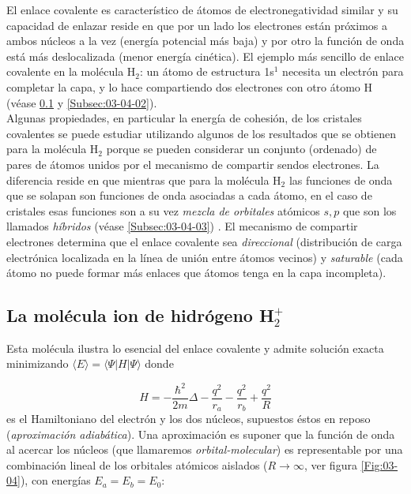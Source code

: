 El enlace covalente es característico de átomos de electronegatividad similar y su capacidad de enlazar reside en que por un lado los electrones están próximos a ambos núcleos a la vez (energía potencial más baja) y por otro la función de onda está más deslocalizada (menor energía cinética). El ejemplo más sencillo de enlace covalente en la molécula H$_2$: un átomo de estructura 1s$^1$ necesita un electrón para completar la capa, y lo hace compartiendo dos electrones con otro átomo H (véase \ref{Subsec:03-04-01} y \ref{Subsec:03-04-02}). \\

Algunas propiedades, en particular la energía de cohesión, de los cristales covalentes se puede estudiar utilizando algunos de los resultados que se obtienen para la molécula H$_2$ porque se pueden considerar un conjunto (ordenado) de pares de átomos unidos por el mecanismo de compartir sendos electrones. La diferencia reside en que mientras que para la molécula H$_2$ las funciones de onda que se solapan son funciones de onda asociadas a cada átomo, en el caso de cristales esas funciones son a su vez \textit{mezcla de orbitales} atómicos $s,p$ que son los llamados \textit{híbridos} (véase \ref{Subsec:03-04-03}) . El mecanismo de compartir electrones determina que el enlace covalente sea \textit{direccional} (distribución de carga electrónica localizada en la línea de unión entre átomos vecinos) y \textit{saturable} (cada átomo no puede formar más enlaces que átomos tenga en la capa incompleta).

\subsection{La molécula ion de hidrógeno H$_2^+$} \label{Subsec:03-04-01}

Esta molécula ilustra lo esencial del enlace covalente y admite solución exacta minimizando $\langle E \rangle = \langle \Psi | H | \Psi \rangle$ donde 

\begin{equation*}
    H = - \frac{\hbar^2}{2m} \Delta - \frac{q^2}{r_a} - \frac{q^2}{r_b} + \frac{q^2}{R}
\end{equation*}
es el Hamiltoniano del electrón y los dos núcleos, supuestos éstos en reposo (\textit{aproximación adiabática}). Una aproximación es suponer que la función de onda al acercar los núcleos (que llamaremos \textit{orbital-molecular}) es representable por una combinación lineal de los orbitales atómicos aislados ($R \rightarrow \infty$, ver figura \ref{Fig:03-04}), con energías $E_a = E_b = E_0$:

